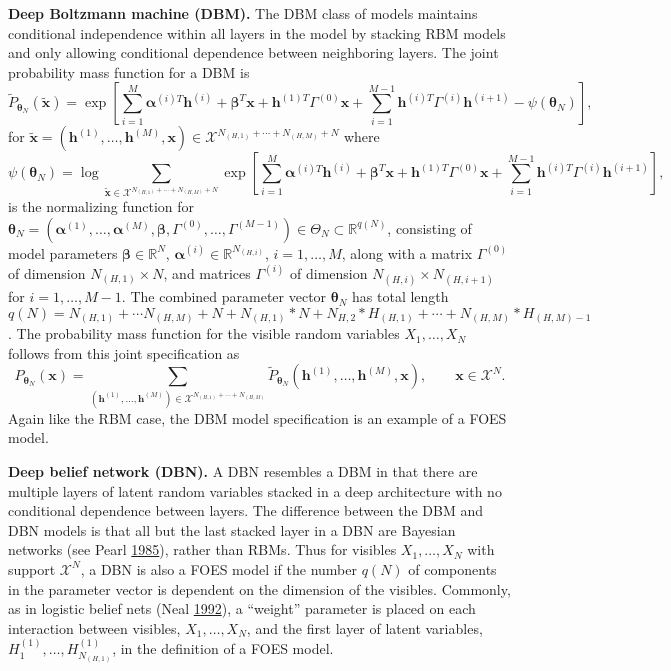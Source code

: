 \documentclass[12pt]{article}
\theoremstyle{definition}
\begin{document}
\textbf{Deep Boltzmann machine (DBM).} The DBM class of models maintains
conditional independence within all layers in the model by stacking RBM
models and only allowing conditional dependence between neighboring
layers. The joint probability mass function for a DBM is \[
\tilde{P}_{\boldsymbol \theta_N} ( \tilde{\boldsymbol x} ) = \exp\left[ \sum\limits_{i = 1}^M\boldsymbol \alpha^{(i)T} \boldsymbol h^{(i)} + \boldsymbol \beta^T \boldsymbol x + \boldsymbol h^{(1)T} \Gamma^{(0)} \boldsymbol x + \sum\limits_{i = 1}^{M - 1} \boldsymbol h^{(i)T} \Gamma^{(i)} \boldsymbol h^{(i + 1)} - \psi(\boldsymbol \theta_N) \right],
\] for
\(\tilde{\boldsymbol x} = (\boldsymbol h^{(1)}, \dots, \boldsymbol h^{(M)}, \boldsymbol x) \in \mathcal{X}^{N_{(H,1)} + \cdots + N_{(H,M)} +N}\)
where \[
\psi(\boldsymbol \theta_N) = \log \sum\limits_{\tilde{\boldsymbol x} \in \mathcal{X}^{N_{(H,1)} + \cdots + N_{(H,M)} +N}} \exp\left[ \sum\limits_{i = 1}^M\boldsymbol \alpha^{(i)T} \boldsymbol h^{(i)} + \boldsymbol \beta^T \boldsymbol x + \boldsymbol h^{(1)T} \Gamma^{(0)} \boldsymbol x + \sum\limits_{i = 1}^{M - 1} \boldsymbol h^{(i)T} \Gamma^{(i)} \boldsymbol h^{(i + 1)}\right],
\] is the normalizing function for
\(\boldsymbol \theta_N = (\boldsymbol \alpha^{(1)}, \dots, \boldsymbol \alpha^{(M)}, \boldsymbol \beta,\Gamma^{(0)}, \dots, \Gamma^{(M - 1)}) \in \Theta_N \subset \mathbb{R}^{q(N)}\),
consisting of model parameters \(\boldsymbol \beta \in \mathbb{R}^N\),
\(\boldsymbol \alpha^{(i)} \in \mathbb{R}^{N_{(H,i)}}\),
\(i = 1, \dots, M\), along with a matrix \(\Gamma^{(0)}\) of dimension
\(N_{(H,1)} \times N\), and matrices \(\Gamma^{(i)}\) of dimension
\(N_{(H,i)} \times N_{(H,i+1)}\) for \(i = 1, \dots, M-1\). The combined
parameter vector \(\boldsymbol \theta_N\) has total length
\(q(N)= N_{(H,1)}+\cdots N_{(H,M)} + N + N_{(H,1)}*N+N_{H,2}*H_{(H,1)}+\cdots +N_{(H,M)}*H_{(H,M)-1}\).
The probability mass function for the visible random variables
\(X_1, \dots, X_N\) follows from this joint specification as \[
P_{\boldsymbol \theta_N} (\boldsymbol x) = \sum\limits_{(\boldsymbol h^{(1)}, \dots, \boldsymbol h^{(M)}) \in \mathcal{X}^{N_{(H,1)} + \cdots + N_{(H,M)}}} \tilde{P}_{\boldsymbol \theta_N} (\boldsymbol h^{(1)}, \dots, \boldsymbol h^{(M)}, \boldsymbol x) , \qquad \boldsymbol x \in \mathcal{X}^N.
\] Again like the RBM case, the DBM model specification is an example of
a FOES model.

\textbf{Deep belief network (DBN).} A DBN resembles a DBM in that there
are multiple layers of latent random variables stacked in a deep
architecture with no conditional dependence between layers. The
difference between the DBM and DBN models is that all but the last
stacked layer in a DBN are Bayesian networks (see Pearl
\protect\hyperlink{ref-pearl985bayesian}{1985}), rather than RBMs. Thus
for visibles \(X_1, \dots, X_N\) with support \(\mathcal{X}^N\), a DBN
is also a FOES model if the number \(q(N)\) of components in the
parameter vector is dependent on the dimension of the visibles.
Commonly, as in logistic belief nets (Neal
\protect\hyperlink{ref-neal1992connectionist}{1992}), a ``weight''
parameter is placed on each interaction between visibles,
\(X_1, \dots, X_N\), and the first layer of latent variables,
\(H^{(1)}_1, \dots, H^{(1)}_{N_{(H,1)}}\), in the definition of a FOES
model.
\end{document}

